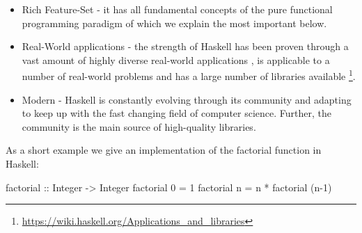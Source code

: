 \begin{itemize}
	\item Rich Feature-Set - it has all fundamental concepts of the pure functional programming paradigm of which we explain the most important below.
	\item Real-World applications - the strength of Haskell has been proven through a vast amount of highly diverse real-world applications \cite{hudak_history_2007}, is applicable to a number of real-world problems \cite{osullivan_real_2008} and has a large number of libraries available \footnote{\url{https://wiki.haskell.org/Applications_and_libraries}}.
	\item Modern - Haskell is constantly evolving through its community and adapting to keep up with the fast changing field of computer science. Further, the community is the main source of high-quality libraries.
\end{itemize}

As a short example we give an implementation of the factorial function in Haskell:
\begin{HaskellCode}
factorial :: Integer -> Integer
factorial 0 = 1
factorial n = n * factorial (n-1)
\end{HaskellCode}

